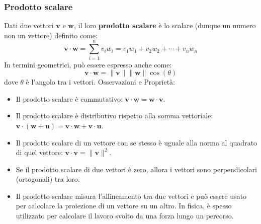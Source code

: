 \documentclass{book}
\begin{document}
\subsubsection{Prodotto scalare}
\noindent\begin{minipage}{\textwidth}
    \begin{theorem}
        Dati due vettori \(\mathbf{v}\) e \(\mathbf{w}\), il loro \textbf{prodotto scalare} è lo scalare (dunque un numero non un vettore) definito come:
        \[
            \mathbf{v} \cdot \mathbf{w} = \sum_{i=1}^{n} v_i w_i = v_1w_1 + v_2w_2 + \cdots + v_nw_n
        \]
        In termini geometrici, può essere espresso anche come:
        \[
            \mathbf{v} \cdot \mathbf{w} = \|\mathbf{v}\| \|\mathbf{w}\| \cos(\theta)
        \]
        dove \(\theta\) è l'angolo tra i vettori.
        \noindent Osservazioni e Proprietà:
        \begin{itemize}
            \item Il prodotto scalare è commutativo: \(\mathbf{v} \cdot \mathbf{w} = \mathbf{w} \cdot \mathbf{v}\).
            \item Il prodotto scalare è distributivo rispetto alla somma vettoriale: \(\mathbf{v} \cdot (\mathbf{w} + \mathbf{u}) = \mathbf{v} \cdot \mathbf{w} + \mathbf{v} \cdot \mathbf{u}\).
            \item Il prodotto scalare di un vettore con se stesso è uguale alla norma al quadrato di quel vettore: \(\mathbf{v} \cdot \mathbf{v} = \|\mathbf{v}\|^2\).
            \item Se il prodotto scalare di due vettori è zero, allora i vettori sono perpendicolari (ortogonali) tra loro.
            \item Il prodotto scalare misura l'allineamento tra due vettori e può essere usato per calcolare la proiezione di un vettore su un altro. In fisica, è spesso utilizzato per calcolare il lavoro svolto da una forza lungo un percorso.
        \end{itemize}
    \end{theorem}
\end{minipage}
\end{document}
